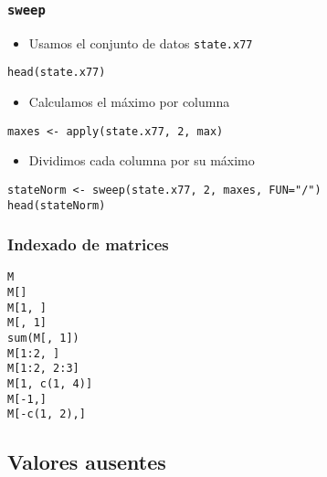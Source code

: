 \documentclass[xcolor={usenames,svgnames,dvipsnames}]{beamer}
\begin{document}
\begin{frame}[fragile]
\frametitle{\texttt{sweep}}
\label{sec-2-2-7}

\begin{itemize}
\item Usamos el conjunto de datos \texttt{state.x77}
\end{itemize}

\lstset{language=R}
\begin{lstlisting}
head(state.x77)
\end{lstlisting}
\begin{itemize}
\item Calculamos el máximo por columna
\end{itemize}

\lstset{language=R}
\begin{lstlisting}
maxes <- apply(state.x77, 2, max)
\end{lstlisting}
\begin{itemize}
\item Dividimos cada columna por su máximo
\end{itemize}

\lstset{language=R}
\begin{lstlisting}
stateNorm <- sweep(state.x77, 2, maxes, FUN="/")
head(stateNorm)
\end{lstlisting}
\end{frame}
\begin{frame}[fragile]
\frametitle{Indexado de matrices}
\label{sec-2-2-8}


\lstset{language=R}
\begin{lstlisting}
M
M[]
M[1, ]
M[, 1]
sum(M[, 1])
M[1:2, ]
M[1:2, 2:3]
M[1, c(1, 4)]
M[-1,]
M[-c(1, 2),]
\end{lstlisting}
    
\end{frame}
\subsection{Valores ausentes}
\label{sec-2-3}
\end{document}
